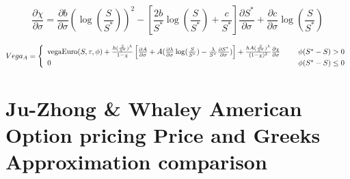 \documentclass[preprint,12pt,1p]{elsarticle}
\begin{document}
\begin{spacing}{1.3}
$$ \frac{\partial \chi}{\partial \sigma} = \frac{\partial b}{\partial \sigma}(\log(\frac{S}{S^*}))^2 - \left[\frac{2b}{S^*} \log (\frac{S}{S^*}) + \frac{c}{S^*} \right]\frac{\partial S^*}{\partial \sigma} + \frac{\partial c}{\partial \sigma} \log (\frac{S}{S^*}) $$

\[   Vega_A = \left\{ 
\begin{array}{ll}
      \text{vegaEuro}(S, \tau, \phi) + \frac{h(\frac{S}{S^*})^{\lambda}}{1-\chi}\left[\frac{\partial A}{\partial \sigma} +A(\frac{\partial \lambda}{\partial \sigma}\log(\frac{S}{S^*}) -\frac{\lambda}{S^*} \frac{\partial S^*}{\partial \sigma} ) \right] + \frac{hA(\frac{S}{S^*})^{\lambda}}{(1-\chi)^2}\frac{\partial \chi}{\partial \sigma} & \hspace{0.5cm}  \phi(S^* - S) > 0\\
      0 & \hspace{0.5cm}  \phi(S^* - S) \leq 0\\
\end{array} 
\right. \]
\end{spacing}

\clearpage
\section{Ju-Zhong \& Whaley American Option pricing Price and Greeks Approximation comparison}
\label{appendix-sec2}
\end{document}
